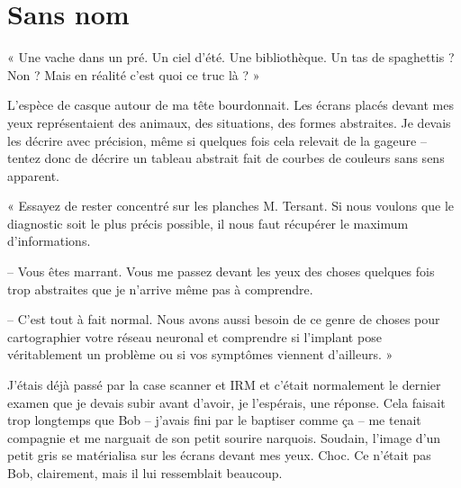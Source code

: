 \chapter{Sans nom}

« Une vache dans un pré. Un ciel d'été. Une bibliothèque. Un tas de spaghettis ? Non ? Mais en réalité c'est quoi ce
truc là ? »

L'espèce de casque autour de ma tête bourdonnait. Les écrans placés devant mes yeux représentaient des animaux, des 
situations, des formes abstraites. Je devais les décrire avec précision, même si quelques fois cela relevait de la
gageure -- tentez donc de décrire un tableau abstrait fait de courbes de couleurs sans sens apparent.

« Essayez de rester concentré sur les planches M. Tersant. Si nous voulons que le diagnostic soit le plus précis
possible, il nous faut récupérer le maximum d'informations.

-- Vous êtes marrant. Vous me passez devant les yeux des choses quelques fois trop abstraites que je n'arrive même pas à
comprendre.

-- C'est tout à fait normal. Nous avons aussi besoin de ce genre de choses pour cartographier votre réseau neuronal et
comprendre si l'implant pose véritablement un problème ou si vos symptômes viennent d'ailleurs. »

J'étais déjà passé par la case scanner et IRM et c'était normalement le dernier examen que je devais subir avant
d'avoir, je l'espérais, une réponse. Cela faisait trop longtemps que Bob -- j'avais fini par le baptiser comme ça -- me
tenait compagnie et me narguait de son petit sourire narquois. Soudain, l'image d'un petit gris se matérialisa sur les
écrans devant mes yeux. Choc. Ce n'était pas Bob, clairement, mais il lui ressemblait beaucoup.
